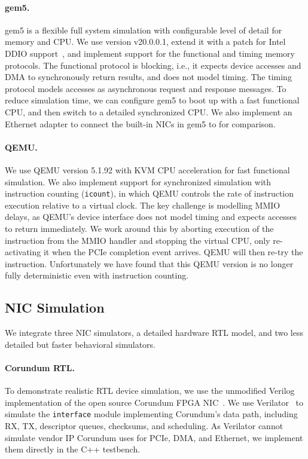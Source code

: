 \paragraph{gem5.}
gem5 is a flexible full system simulation with configurable level of
detail for memory and CPU.
%
We use version v20.0.0.1, extend it with a patch for Intel DDIO
support~\cite{gem5_ddio}, and implement support for the functional and timing
memory protocols.
%
The functional protocol is blocking, i.e., it expects device accesses and
DMA to synchronously return results, and does not model timing.
%
The timing protocol models accesses as asynchronous request and
response messages.
%
To reduce simulation time, we can configure gem5 to boot up with a fast
functional CPU, and then switch to a detailed synchronized CPU.
%
We also implement an Ethernet adapter to connect the built-in NICs in gem5 to
\sysname for comparison.

\paragraph{QEMU.}
We use QEMU version 5.1.92 with KVM CPU acceleration for fast
functional simulation.
%
We also implement support for synchronized simulation with instruction counting
(\texttt{icount}), in which QEMU controls the rate of instruction execution
relative to a virtual clock.
%
The key challenge is modelling MMIO delays, as QEMU's device interface does not
model timing and expects accesses to return immediately.
%
We work around this by aborting execution of the instruction from the
MMIO handler and stopping the virtual CPU, only re-activating it when
the \sysname PCIe completion event arrives.
%
QEMU will then re-try the instruction.
%
Unfortunately we have found that this QEMU version is no longer fully
deterministic even with instruction counting.


\subsection{NIC Simulation}
We integrate three NIC simulators, a detailed hardware RTL model, and
two less detailed but faster behavioral simulators.

\paragraph{Corundum RTL.}
To demonstrate realistic RTL device simulation, we use the unmodified Verilog
implementation of the open source Corundum FPGA NIC~\cite{forencich:corundum}.
%
We use Verilator~\cite{software:verilator} to simulate the \texttt{interface}
module implementing Corundum's data path, including RX, TX, descriptor queues,
checksums, and scheduling.
%
As Verilator cannot simulate vendor IP Corundum uses for PCIe, DMA, and
Ethernet, we implement them directly in the C++ testbench.


